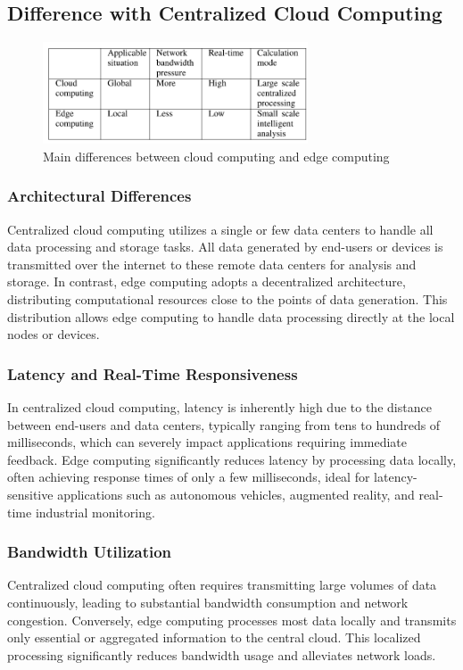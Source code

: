 \documentclass[runningheads]{llncs}
\begin{document}
\subsection{Difference with Centralized Cloud Computing}

\begin{figure}[ht]
    \centering
    \includegraphics[width=0.7\textwidth]{IMG/5.png}
    \caption{Main differences between cloud computing and edge computing}
    \label{fig:cloud_vs_edge}
    \end{figure}
    \FloatBarrier



\subsubsection{Architectural Differences}
Centralized cloud computing utilizes a single or few data centers to handle all data processing and storage tasks. All data generated by end-users or devices is transmitted over the internet to these remote data centers for analysis and storage. In contrast, edge computing adopts a decentralized architecture, distributing computational resources close to the points of data generation. This distribution allows edge computing to handle data processing directly at the local nodes or devices.

\subsubsection{Latency and Real-Time Responsiveness}
In centralized cloud computing, latency is inherently high due to the distance between end-users and data centers, typically ranging from tens to hundreds of milliseconds, which can severely impact applications requiring immediate feedback. Edge computing significantly reduces latency by processing data locally, often achieving response times of only a few milliseconds, ideal for latency-sensitive applications such as autonomous vehicles, augmented reality, and real-time industrial monitoring.

\subsubsection{Bandwidth Utilization}
Centralized cloud computing often requires transmitting large volumes of data continuously, leading to substantial bandwidth consumption and network congestion. Conversely, edge computing processes most data locally and transmits only essential or aggregated information to the central cloud. This localized processing significantly reduces bandwidth usage and alleviates network loads.
\end{document}
